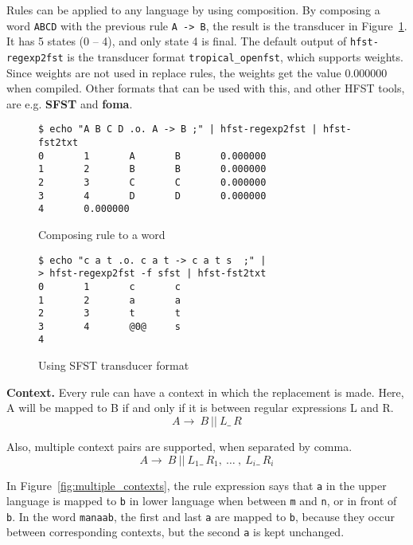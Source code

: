 \documentclass{llncs}
\begin{document}
Rules can be applied to any language by using composition. 
By composing a word \verb!ABCD! with the previous rule \verb!A -> B!, 
the result is the transducer in Figure~\ref{fig:replace_compose}. 
It has 5 states (0 -- 4), and only state 4 is final. The default output of \verb!hfst-regexp2fst! is 
the transducer format \verb!tropical_openfst!, which supports weights. 
Since weights are not used in replace rules, the weights get the value 0.000000 when compiled. 
Other formats that can be used with this, and other HFST tools, are e.g. \textbf{SFST} and \textbf{foma}.

\begin{figure} [h!]
{\scriptsize
\begin{verbatim}
$ echo "A B C D .o. A -> B ;" | hfst-regexp2fst | hfst-fst2txt
0       1       A       B       0.000000
1       2       B       B       0.000000
2       3       C       C       0.000000
3       4       D       D       0.000000
4       0.000000
\end{verbatim}
}
\caption{Composing rule to a word}
\label{fig:replace_compose}
\end{figure}


\begin{figure} [h!]
{\scriptsize
\begin{verbatim}
$ echo "c a t .o. c a t -> c a t s  ;" |
> hfst-regexp2fst -f sfst | hfst-fst2txt
0       1       c       c
1       2       a       a
2       3       t       t
3       4       @0@     s
4
\end{verbatim}
}
\caption{Using SFST transducer format}
\label{fig:sfst_format}
\end{figure}



\textbf{Context.} Every rule can have a context in which the replacement is made. 
Here, A will be mapped to B if and only if it is between regular expressions
L and R.
\begin{equation}
  A \rightarrow\ B\ ||\ L \_\  R
\end{equation}

Also, multiple context pairs are supported, when separated by comma.
\begin{equation}
  A \rightarrow\ B\ ||\ L_1 \_\  R_1 ,\ \ldots\ ,\ L_i \_\  R_i
\end{equation}

In Figure~\ref{fig:multiple_contexts}, the rule expression says that \verb!a! in the 
upper language is mapped to \verb!b! in lower language 
when between \verb!m! and \verb!n!, or in front of \verb!b!. 
In the word \verb!manaab!, the first and last \verb!a! are mapped to \verb!b!, 
because they occur between corresponding contexts, but the second \verb!a! is kept unchanged.
\end{document}
